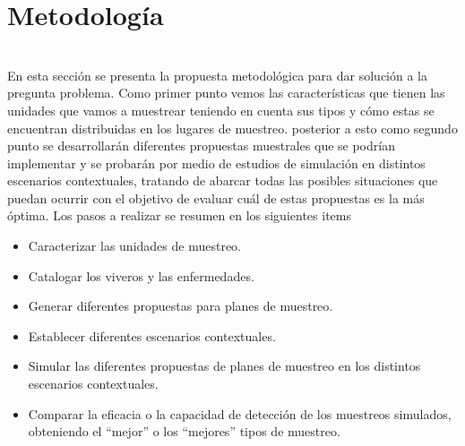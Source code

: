 \chapter{Metodolog\'{i}a}
~\\En esta secci\'{o}n se presenta la propuesta metodol\'{o}gica para dar soluci\'{o}n a la pregunta problema. Como primer punto vemos las caracter\'{i}sticas que tienen las unidades que vamos a muestrear teniendo en cuenta sus tipos y c\'{o}mo estas se encuentran distribuidas en los lugares de muestreo. posterior a esto como segundo punto se desarrollar\'{a}n diferentes propuestas muestrales que se podr\'{i}an implementar y se probar\'{a}n por medio de estudios de simulaci\'{o}n en distintos escenarios contextuales, tratando de abarcar todas las posibles situaciones que puedan ocurrir con el objetivo de evaluar cu\'{a}l de estas propuestas es la m\'{a}s \'{o}ptima. Los pasos a realizar se resumen en los siguientes items

\begin{itemize}
\item Caracterizar las unidades de muestreo.
\item Catalogar los viveros y las enfermedades.
\item Generar diferentes propuestas para planes de muestreo.
\item Establecer diferentes escenarios contextuales.
\item Simular las diferentes propuestas de planes de muestreo en los distintos escenarios contextuales.
\item Comparar la eficacia o la capacidad de detecci\'{o}n de los muestreos simulados, obteniendo el ``mejor'' o los ``mejores'' tipos de muestreo. 
\end{itemize}